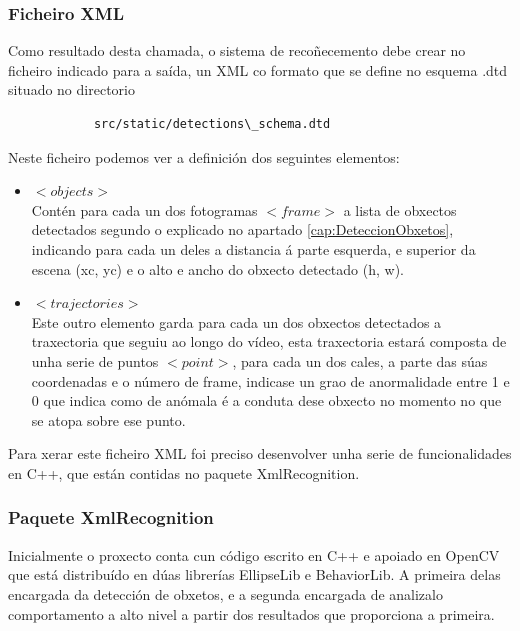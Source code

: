         \subsubsection{Ficheiro XML}
            Como resultado desta chamada, o sistema de recoñecemento debe crear no ficheiro indicado 
            para a saída, un XML co formato que se define no esquema .dtd situado no directorio
            
            \begin{verbatim}
            src/static/detections\_schema.dtd
            \end{verbatim}       

            Neste ficheiro podemos ver a definición dos seguintes elementos:
            \begin{itemize}
            \item{{\textbf{$<objects>$\\}}}
                Contén para cada un dos fotogramas $<frame>$ a lista de obxectos detectados segundo
                o explicado no apartado \ref{cap:DeteccionObxetos}, indicando para cada un deles a
                distancia á parte esquerda, e superior da escena (xc, yc) e o alto e ancho do obxecto
                detectado (h, w).
            \item{{\textbf{$<trajectories>$\\}}}
                Este outro elemento garda para cada un dos obxectos detectados a traxectoria que 
                seguiu ao longo do vídeo, esta traxectoria estará composta de unha serie de puntos
                $<point>$, para cada un dos cales, a parte das súas coordenadas e o número de 
                frame, indicase un grao de anormalidade entre 1 e 0 que indica como de anómala é 
                a conduta dese obxecto no momento no que se atopa sobre ese punto.
            \end{itemize}
            
            Para xerar este ficheiro XML foi preciso desenvolver unha serie de funcionalidades en C++,
            que están contidas no paquete XmlRecognition.
        
        \subsubsection{Paquete XmlRecognition}
            Inicialmente o proxecto conta cun código escrito en C++ e apoiado en OpenCV que está distribuído en
            dúas librerías EllipseLib e BehaviorLib. A primeira delas encargada da detección de obxetos, e a segunda
            encargada de analizalo comportamento a alto nivel a partir dos resultados que proporciona a primeira.\\
            
